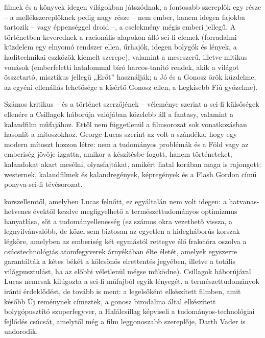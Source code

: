\documentclass[a4paper,12pt,twoside]{report}
\theoremstyle{definition}
\begin{document}
	\Az filmek és a könyvek idegen világokban játszódnak, a fontosabb szereplők egy része – a mellékszereplőknek pedig nagy része – nem ember, hanem idegen fajokba tartozik – vagy éppenséggel droid –, a cselekmény mégis emberi jellegű. A történetben keverednek a racionális alapokon álló sci-fi elemek (forradalmi küzdelem egy elnyomó rendszer ellen, űrhajók, idegen bolygók és lények, a haditechnikai eszközök kiemelt szerepe), valamint a meseszerű, illetve mitikus vonások (emberfeletti hatalommal bíró harcos-tanító rendek, akik a világot összetartó, misztikus jellegű „Erőt” használják; a Jó és a Gonosz örök küzdelme, az egyéni ellenállás lehetősége a kísértő Gonosz ellen, a Legkisebb Fiú győzelme).
	
	Számos kritikus – és a történet szerzőjének – véleménye szerint a sci-fi külsőségek ellenére a Csillagok háborúja valójában közelebb áll a fantasy, valamint a kalandfilm műfajához. Ettől nem függetlenül a filmsorozat sok vonatkozásban hasonlít a mítoszokhoz. George Lucas szerint az volt a szándéka, hogy egy modern mítoszt hozzon létre: nem a tudományos problémák és a Föld vagy az emberiség jövője izgatta, amikor a készítésbe fogott, hanem történeteket, kalandokat akart mesélni, olyasfajtákat, amikért fiatal korában maga is rajongott: westernek, kalandfilmek és kalandregények, képregények és a Flash Gordon című ponyva-sci-fi tévésorozat. 
	
	\Az korszellemtől, amelyben Lucas felnőtt, ez egyáltalán nem volt idegen: a hatvanas-hetvenes évektől kezdve megfigyelhető a természettudományos optimizmus hanyatlása, sőt a tudományellenesség (ez számos okra vezethető vissza, a legnyilvánvalóbb, de közel sem biztosan az egyetlen a hidegháborús korszak légköre, amelyben az emberiség két egymástól rettegve élő frakcióra oszolva a csúcstechnológiás atomfegyverek árnyékában élte életét, amelyek egyszerre garantálták a kétes békét a kölcsönös elrettentés jegyében, illetve a totális világpusztulást, ha az előbbi véletlenül mégse működne). \Az Csillagok háborújával Lucas nemcsak kilúgozta a sci-fi műfajból egyik lényegét, a természettudományok iránti érdeklődést, de tovább is ment: a legelsőként elkészített filmben, amit később Új reménynek címeztek, a gonosz birodalma által elkészített bolygópusztító szuperfegyver, a Halálcsillag képviseli a tudományos-technológiai fejlődés csúcsát, amelytől még a film leggonoszabb szereplője, Darth Vader is undorodik. 
	
\end{document}
